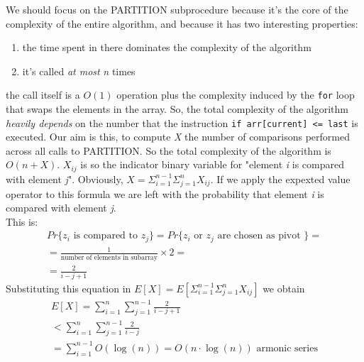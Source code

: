\documentclass{article}
\begin{document}
				We should focus on the PARTITION subprocedure because it's the core of the complexity of the entire algorithm, and because it has two interesting properties:
				\begin{enumerate}
					\item the time spent in there dominates the complexity of the algorithm
					\item it's called \textit{at most} \emph{n} times					
				\end{enumerate}
				the call itself is a $O(1)$ operation plus the complexity induced by the \verb|for| loop that swaps the elements in the array. So, the total complexity of the algorithm \textit{heavily depends} on the number that the instruction \verb|if arr[current] <= last| is executed. Our aim is this, to compute \emph{X} the number of comparisons performed across all calls to PARTITION. So the total complexity of the algorithm is $O(n + X)$. $X_{ij}$ is so the indicator binary variable for "element \emph{i} is compared with element \emph{j}". Obviously, $X = \Sigma_{i = 1}^{n-1} \Sigma_{j = 1}^{n} X_{ij}$. If we apply the expexted value operator to this formula we are left with the probability that element \emph{i} is compared with element \emph{j}.\\
				This is:
				\begin{align*}
					Pr\{z_i \text{ is compared to } z_j\} = Pr\{z_i \text{ or } z_j \text{ are chosen as pivot }\} = \\
					= \frac{1}{\text{number of elements in subarray}} \times 2 = \\
					= \frac{2}{i - j + 1}
				\end{align*}
				Substituting this equation in $E[X] = E[\Sigma_{i = 1}^{n-1} \Sigma_{j = 1}^{n} X_{ij}]$ we obtain
				\begin{align*}
					E[X] = \sum_{i = 1}^n \sum_{j = 1}^{n - 1} \frac{2}{i - j + 1} \\
					< \sum_{i = 1}^n \sum_{j = 1}^{n - 1} \frac{2}{i - j} \\
					= \sum_{i = 1}^{n - 1} O(\log(n)) = O(n \cdot \log(n)) \text{ armonic series}
				\end{align*}
						
\end{document}
